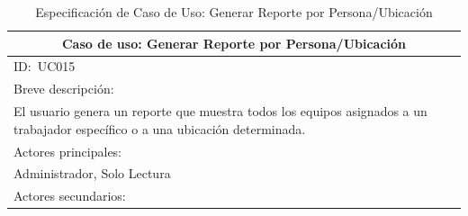 \documentclass[stu, 12pt, letterpaper, donotrepeattitle, floatsintext, natbib]{apa7}
\begin{document}
\begin{longtable}{@{} p{16.5cm} @{}}
    \caption{Especificación de Caso de Uso: Generar Reporte por Persona/Ubicación}\label{tab:UC015}                                                                                                                                                                            \\ \toprule
    \multicolumn{1}{c}{Caso de uso: Generar Reporte por Persona/Ubicación}                                                                                                                                                                                                     \\ \midrule
    ID:~UC015                                                                                                                                                                                                                                                                  \\ \midrule
    Breve descripción:                                                                                                                                                                                                                                                         \\
    El usuario genera un reporte que muestra todos los equipos asignados a un trabajador específico o a una ubicación determinada.                                                                                                                                             \\ \midrule
    Actores principales:                                                                                                                                                                                                                                                       \\
    Administrador, Solo Lectura                                                                                                                                                                                                                                                \\ \midrule
    Actores secundarios:                                                                                                                                                                                                                                                       \\

\end{longtable}
\end{document}
